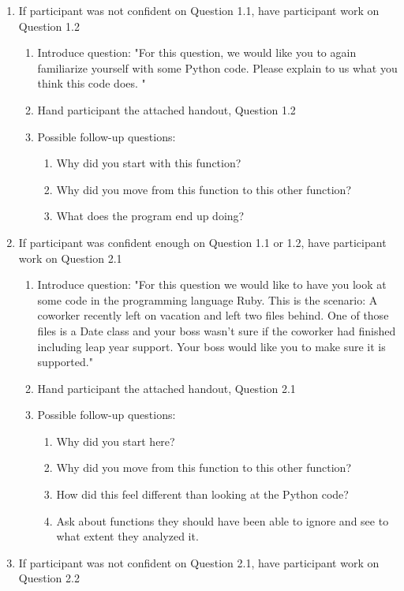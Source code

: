 \documentclass{article}
\begin{document}
\begin{enumerate}
  \item If participant was not confident on Question 1.1, have participant work on Question 1.2
   \begin{enumerate}
    \item Introduce question: "For this question, we would like you to again familiarize yourself with some Python code. Please explain to us what you think this code does. "
    \item Hand participant the attached handout, Question 1.2
    \item Possible follow-up questions:
     \begin{enumerate}
      \item Why did you start with this function?
      \item Why did you move from this function to this other function?
      \item What does the program end up doing?
    \end{enumerate}
  \end{enumerate}
  \item If participant was confident enough on Question 1.1 or 1.2, have participant work on Question 2.1
   \begin{enumerate}
    \item Introduce question: "For this question we would like to have you look at some code in the programming language Ruby. This is the scenario: A coworker recently left on vacation and left two files behind. One of those files is a Date class and your boss wasn't sure if the coworker had finished including leap year support. Your boss would like you to make sure it is supported."
    \item Hand participant the attached handout, Question 2.1
    \item Possible follow-up questions:
     \begin{enumerate}
      \item Why did you start here?
      \item Why did you move from this function to this other function?
      \item How did this feel different than looking at the Python code?
      \item Ask about functions they should have been able to ignore and see to what extent they analyzed it.
    \end{enumerate}
  \end{enumerate}
  \item If participant was not confident on Question 2.1, have participant work on Question 2.2

\end{enumerate}
\end{document}
